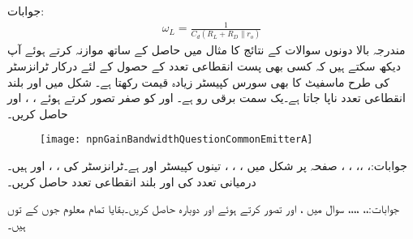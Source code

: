جوابات:
\begin{align*}
\omega_L=\frac{1}{C_d \left(R_L+R_D \mathbin{\|} r_o \right)}
\end{align*}
مندرجہ بالا دونوں سوالات کے نتائج کا مثال  میں حاصل  کے ساتھ موازنہ کرتے ہوئے آپ دیکھ سکتے ہیں کہ کسی بھی پست انقطاعی تعدد کے حصول کے لئے درکار ٹرانزسٹر کی طرح ماسفیٹ کا بھی سورس کپیسٹر زیادہ قیمت رکھتا ہے۔
شکل  میں  اور بلند انقطاعی تعدد  ناپا جاتا ہے۔یک سمت  برقی رو  ہے۔ اور  کو صفر تصور کرتے ہوئے ، ،  اور  حاصل کریں۔  
\begin{figure}
\centering
\texttt{[image: npnGainBandwidthQuestionCommonEmitterA]}
\caption{}
\label{شکل_تعددی_ردعمل_سوال_مشترک_مخارج_افزائش_دائرہ}
\end{figure}

جوابات:، ،، ، ، 
صفحہ  پر شکل  میں ، ، ، تینوں کپیسٹر  اور  ہے۔ٹرانزسٹر کی ، ،  اور  ہیں۔درمیانی تعدد کی  اور  بلند انقطاعی تعدد  حاصل کریں۔

جوابات:،، ،،،، 
سوال  میں ،  اور  تصور کرتے ہوئے   اور  دوبارہ حاصل کریں۔بقایا تمام معلوم جوں کے توں ہیں۔

